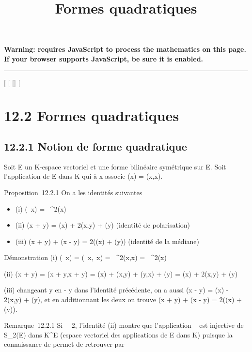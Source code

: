 \documentclass[]{article}
\title{Formes quadratiques}
\author{}
\date{}
\begin{document}
\maketitle

\textbf{Warning: 
requires JavaScript to process the mathematics on this page.\\ If your
browser supports JavaScript, be sure it is enabled.}

\begin{center}\rule{3in}{0.4pt}\end{center}

[
[
[]
[

\section{12.2 Formes quadratiques}

\subsection{12.2.1 Notion de forme quadratique}

Soit E un K-espace vectoriel et \phi une forme bilinéaire symétrique sur E.
Soit \Phi l'application de E dans K qui à x associe \Phi(x) = \phi(x,x).

Proposition~12.2.1 On a les identités suivantes

\begin{itemize}
\itemsep1pt\parskip0pt
\item
  (i) \Phi(\lambda~x) = \lambda~^2\Phi(x)
\item
  (ii) \Phi(x + y) = \Phi(x) + 2\phi(x,y) + \Phi(y) (identité de polarisation)
\item
  (iii) \Phi(x + y) + \Phi(x - y) = 2(\Phi(x) + \Phi(y)) (identité de la médiane)
\end{itemize}

Démonstration (i) \Phi(\lambda~x) = \phi(\lambda~x,\lambda~x) = \lambda~^2\phi(x,x) =
\lambda~^2\Phi(x)

(ii) \Phi(x + y) = \phi(x + y,x + y) = \Phi(x) + \phi(x,y) + \phi(y,x) + \Phi(y) = \Phi(x) +
2\phi(x,y) + \Phi(y)

(iii) changeant y en - y dans l'identité précédente, on a aussi \Phi(x - y)
= \Phi(x) - 2\phi(x,y) + \Phi(y), et en additionnant les deux on trouve \Phi(x + y)
+ \Phi(x - y) = 2(\Phi(x) + \Phi(y)).

Remarque~12.2.1 Si
\mathrmcarK\mathrel\neq~~2,
l'identité (ii) montre que l'application \phi\mapsto~\Phi
est injective de S_2(E) dans K^E (espace vectoriel
des applications de E dans K) puisque la connaissance de \Phi permet de
retrouver \phi par
\end{document}
